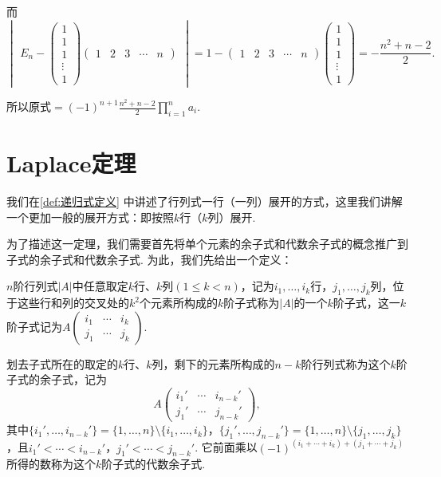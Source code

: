 \begin{solution}
    而 \[ \begin{vmatrix}E_n-\begin{pmatrix}
                1 \\1\\1\\\vdots\\1
            \end{pmatrix}\begin{pmatrix}1 & 2 & 3 & \cdots & n\end{pmatrix}\end{vmatrix}
        =1-\begin{pmatrix}1 & 2 & 3 & \cdots & n\end{pmatrix}
        \begin{pmatrix}1 \\ 1 \\ 1 \\ \vdots \\ 1\end{pmatrix}
        =-\frac{n^2+n-2}{2}. \]

    所以原式$\displaystyle =(-1)^{n+1}\frac{n^2+n-2}{2}\prod_{i=1}^na_i$.
\end{solution}

\section{Laplace定理}
我们在\autoref{def:递归式定义} 中讲述了行列式一行（一列）展开的方式，这里我们讲解一个更加一般的展开方式：即按照$k$行（$k$列）展开.

为了描述这一定理，我们需要首先将单个元素的余子式和代数余子式的概念推广到子式的余子式和代数余子式. 为此，我们先给出一个定义：
\begin{definition}{}{}
    $n$阶行列式$|A|$中任意取定$k$行、$k$列$(1\leqslant k<n)$，记为$i_1,\ldots,i_k$行，$j_1,\ldots,j_k$列，位于这些行和列的交叉处的$k^2$个元素所构成的$k$阶子式称为$|A|$的一个$k$阶子式，这一$k$阶子式记为$A\begin{pmatrix}
            i_1 & \cdots & i_k \\
            j_1 & \cdots & j_k
        \end{pmatrix}$.

    划去子式所在的取定的$k$行、$k$列，剩下的元素所构成的$n-k$阶行列式称为这个$k$阶子式的余子式，记为
    \[A\begin{pmatrix}
            i_1' & \cdots & i_{n-k}' \\
            j_1' & \cdots & j_{n-k}'
        \end{pmatrix},\]
    其中$\{i_1',\ldots,i_{n-k}'\}=\{1,\ldots,n\}\setminus\{i_1,\ldots,i_k\}$，$\{j_1',\ldots,j_{n-k}'\}=\{1,\ldots,n\}\setminus\{j_1,\ldots,j_k\}$，且$i_1'<\cdots<i_{n-k}'$，$j_1'<\cdots<j_{n-k}'$. 它前面乘以$(-1)^{(i_1+\cdots+i_k)+(j_1+\cdots+j_k)}$所得的数称为这个$k$阶子式的代数余子式.
\end{definition}

